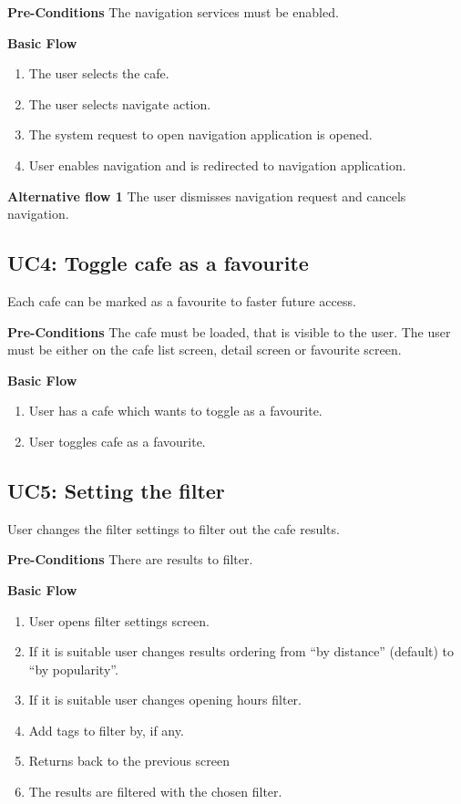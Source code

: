 \textbf{Pre-Conditions} The navigation services must be enabled.

\newpara
\textbf{Basic Flow}

\begin{enumerate}
    \item The user selects the cafe.
    \item The user selects navigate action. 
    \item The system request to open navigation application is opened. 
    \item User enables navigation and is redirected to navigation application. 
\end{enumerate}

\textbf{Alternative flow 1} The user dismisses navigation request and cancels navigation.

\subsection{UC4: Toggle cafe as a favourite}
Each cafe can be marked as a favourite to faster future access. 

\textbf{Pre-Conditions} The cafe must be loaded, that is visible to the user. The user must be either on the cafe list screen, detail screen or favourite screen. 

\newpara
\textbf{Basic Flow}

\begin{enumerate}
    \item User has a cafe which wants to toggle as a favourite.
    \item User toggles cafe as a favourite.
\end{enumerate}


\subsection{UC5: Setting the filter}
User changes the filter settings to filter out the cafe results.

\textbf{Pre-Conditions} There are results to filter.

\newpara
\textbf{Basic Flow}

\begin{enumerate}
    \item User opens filter settings screen.
    \item If it is suitable user changes results ordering from ``by distance'' (default) to ``by popularity''.
    \item If it is suitable user changes opening hours filter.
    \item Add tags to filter by, if any.  
    \item Returns back to the previous screen
    \item The results are filtered with the chosen filter.
\end{enumerate}

